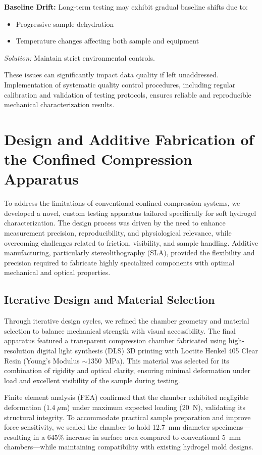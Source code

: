 \textbf{Baseline Drift:}  
Long-term testing may exhibit gradual baseline shifts due to:
\begin{itemize}
    \item Progressive sample dehydration
    \item Temperature changes affecting both sample and equipment
\end{itemize}
\textit{Solution:} Maintain strict environmental controls.

These issues can significantly impact data quality if left unaddressed. Implementation of systematic quality control procedures, including regular calibration and validation of testing protocols, ensures reliable and reproducible mechanical characterization results.

\section{Design and Additive Fabrication of the Confined Compression Apparatus}

To address the limitations of conventional confined compression systems, we developed a novel, custom testing apparatus tailored specifically for soft hydrogel characterization. The design process was driven by the need to enhance measurement precision, reproducibility, and physiological relevance, while overcoming challenges related to friction, visibility, and sample handling. Additive manufacturing, particularly stereolithography (SLA), provided the flexibility and precision required to fabricate highly specialized components with optimal mechanical and optical properties.

\subsection{Iterative Design and Material Selection}

Through iterative design cycles, we refined the chamber geometry and material selection to balance mechanical strength with visual accessibility. The final apparatus featured a transparent compression chamber fabricated using high-resolution digital light synthesis (DLS) 3D printing with Loctite Henkel 405 Clear Resin (Young's Modulus $\sim$1350~MPa). This material was selected for its combination of rigidity and optical clarity, ensuring minimal deformation under load and excellent visibility of the sample during testing.

Finite element analysis (FEA) confirmed that the chamber exhibited negligible deformation ($1.4~\mu\mathrm{m}$) under maximum expected loading (20~N), validating its structural integrity. To accommodate practical sample preparation and improve force sensitivity, we scaled the chamber to hold 12.7~mm diameter specimens—resulting in a 645\% increase in surface area compared to conventional 5~mm chambers—while maintaining compatibility with existing hydrogel mold designs.


